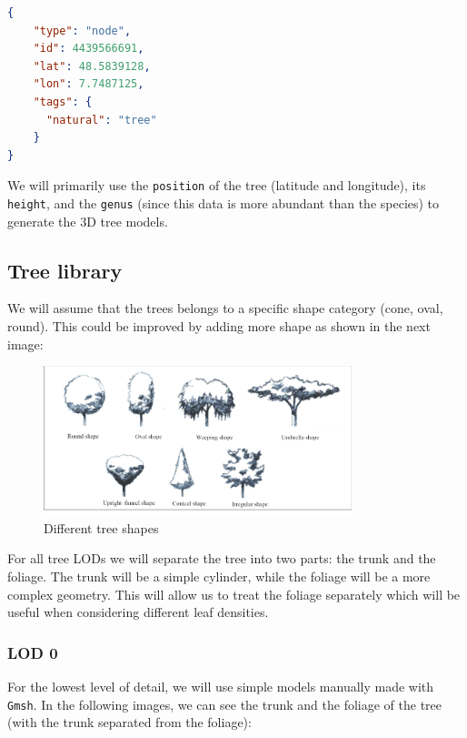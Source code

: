 \documentclass[12pt]{article}
\begin{document}
\begin{lstlisting}[language=json]
{
    "type": "node",
    "id": 4439566691,
    "lat": 48.5839128,
    "lon": 7.7487125,
    "tags": {
      "natural": "tree"
    }
}
\end{lstlisting}

We will primarily use the \texttt{position} of the tree (latitude and
longitude), its \texttt{height}, and the \texttt{genus} (since this data is
more abundant than the species) to generate the 3D tree models.

\subsection{Tree library}
We will assume that the trees belongs to a specific shape category (cone, oval, 
round). This could be improved by adding more shape as shown in the next image:
\begin{figure}[H]
    \centering
    \includegraphics[width=0.8\textwidth]{images/Different-types-of-the-trees-shape.png}
    \caption{Different tree shapes\cite{img:tree-shape}}
\end{figure}


For all tree LODs we will separate the tree into two parts: the trunk and the
foliage. The trunk will be a simple cylinder, while the foliage will be a more 
complex geometry. This will allow us to treat the foliage separately which will 
be useful when considering different leaf densities.

\subsubsection{LOD 0}
For the lowest level of detail, we will use simple models manually made with 
\texttt{Gmsh}\cite{gmsh}. In the following images, we can see the trunk and the
foliage of the tree (with the trunk separated from the foliage):
\end{document}
